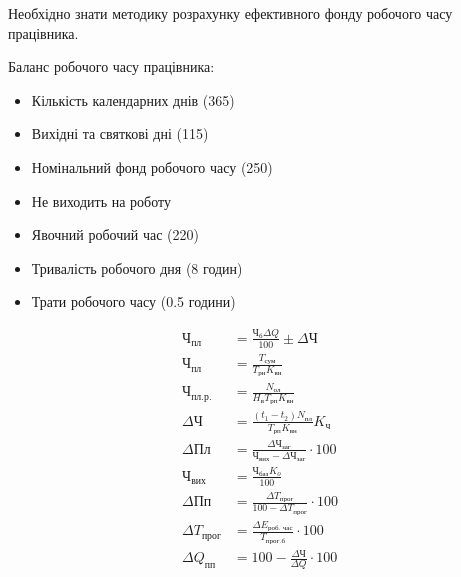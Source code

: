 \documentclass[a5paper,10pt,notitlepage,pdftex,headsepline]{scrartcl}
\begin{document}
    Необхідно знати методику розрахунку ефективного фонду робочого часу
    працівника.

    Баланс робочого часу працівника:
    \begin{itemize}
      \item Кількість календарних днів (365)
      \item Вихідні та святкові дні (115)
      \item Номінальний фонд робочого часу (250)
      \item Не виходить на роботу
      \item Явочний робочий час (220)
      \item Тривалість робочого дня (8 годин)
      \item Трати робочого часу (0.5 години)
    \end{itemize}

    \begin{align}
      \text{Ч}_\text{пл} &= \frac{\text{Ч}_\text{б} \Delta Q}{100} \pm \Delta
      \text{Ч}\label{eq:1}\\
      \text{Ч}_\text{пл} &= \frac{T_\text{сум}}{T_\text{рн}
      K_\text{вн}}\label{eq:2}\\
      \text{Ч}_\text{пл.р.} &= \frac{N_\text{ол}}{H_\text{в} T_\text{рп}
      K_\text{вн}}\label{eq:3}\\
      \Delta\text{Ч} &= \frac{\left(t_1 - t_2\right)N_\text{пл}}{T_\text{рп}
      K_\text{вн}} K_\text{ч}\label{eq:4}\\
      \Delta\text{Пл} &= \frac{\Delta\text{Ч}_\text{заг}}{\text{Ч}_\text{вих}
      - \Delta\text{Ч}_\text{заг}} \cdot 100\label{eq:5}\\
      \text{Ч}_\text{вих} &= \frac{\text{Ч}_\text{баз} K_o}{100}\label{eq:6}\\
      \Delta\text{Пп} &= \frac{\Delta T_\text{прог}}{100 - \Delta
        T_\text{прог}} \cdot 100\label{eq:7}\\
      \Delta T_\text{прог} &= \frac{\Delta E_\text{роб. час}}{T_\text{прог.б}}
      \cdot 100\label{eq:8}\\
      \Delta Q_\text{пп} &= 100 - \frac{\Delta\text{Ч}}{\Delta Q} \cdot
      100\label{eq:9}
    \end{align}
\end{document}
